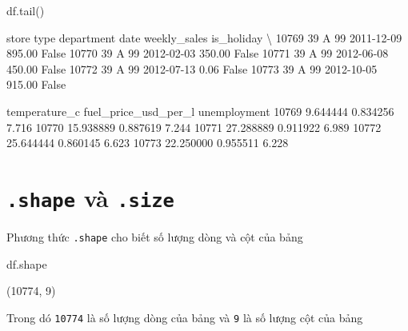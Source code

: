 \documentclass[
]{book}
\newenvironment{Shaded}{\begin{snugshade}}{\end{snugshade}}
\newcommand{\NormalTok}[1]{#1}
\begin{document}
\begin{Shaded}
\begin{Highlighting}[]
\NormalTok{df.tail()}
\end{Highlighting}
\end{Shaded}

\begin{Shaded}
\begin{Highlighting}[]
\NormalTok{       store type  department        date  weekly\_sales  is\_holiday  \textbackslash{}}
\NormalTok{10769     39    A          99  2011{-}12{-}09        895.00       False   }
\NormalTok{10770     39    A          99  2012{-}02{-}03        350.00       False   }
\NormalTok{10771     39    A          99  2012{-}06{-}08        450.00       False   }
\NormalTok{10772     39    A          99  2012{-}07{-}13          0.06       False   }
\NormalTok{10773     39    A          99  2012{-}10{-}05        915.00       False   }

\NormalTok{       temperature\_c  fuel\_price\_usd\_per\_l  unemployment  }
\NormalTok{10769       9.644444              0.834256         7.716  }
\NormalTok{10770      15.938889              0.887619         7.244  }
\NormalTok{10771      27.288889              0.911922         6.989  }
\NormalTok{10772      25.644444              0.860145         6.623  }
\NormalTok{10773      22.250000              0.955511         6.228 }
\end{Highlighting}
\end{Shaded}

\section{\texorpdfstring{\texttt{.shape} và \texttt{.size}}{.shape và .size}}\label{shape-vuxe0-.size}

Phương thức \texttt{.shape} cho biết số lượng dòng và cột của bảng

\begin{Shaded}
\begin{Highlighting}[]
\NormalTok{df.shape}
\end{Highlighting}
\end{Shaded}

\begin{Shaded}
\begin{Highlighting}[]
\NormalTok{(10774, 9)}
\end{Highlighting}
\end{Shaded}

Trong dó \texttt{10774} là số lượng dòng của bảng và \texttt{9} là số lượng cột của bảng
\end{document}
